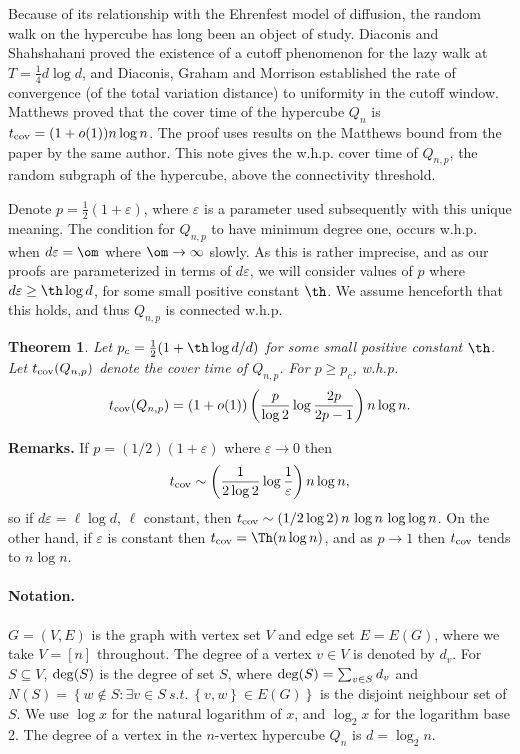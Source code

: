 \documentclass[12pt]{article}
\def\deg{\text{deg}}
\def\e{\varepsilon} \def\f{\phi} \def\F{{\Phi}} \def\vp{\varphi} \def\g{\gamma}
\newtheorem{theorem}{Theorem}
\newcommand{\ooi}{(1+o(1))}
\newcommand{\brac}[1]{\left(#1\right)}
\newcommand{\sfrac}[2]{\frac{\scriptstyle #1}{\scriptstyle #2}}
\def\half{\sfrac{1}{2}}
\newcommand{\rai}{\rightarrow \infty}
\newcommand{\ra}{\rightarrow}
\newcommand{\set}[1]{\left\{#1\right\}}
\def\seq{\subseteq}
\def\tc{t_{\rm cov}}
\def\deg{{\rm deg}}
\begin{document}
Because  of its relationship with the Ehrenfest model of diffusion, the random walk on the hypercube has long been an object of study. Diaconis and Shahshahani \cite{DS} proved the existence of a cutoff phenomenon for the lazy walk
at $T= \sfrac{1}{4} d \log d$, and Diaconis, Graham and Morrison \cite{DGM} established the  rate of convergence
(of the total variation distance) to uniformity in the cutoff window.
Matthews \cite{Matt2} proved that the cover time of the hypercube $Q_n$ is $\tc =\ooi n \log n$.
The proof uses
results on the Matthews bound from the paper \cite{Matt1} by the same author.
This note  gives the w.h.p. cover time of $Q_{n,p}$, the random subgraph of the hypercube, above the connectivity threshold.

Denote $p= \half(1+\e)$, where $\e$ is a parameter  used subsequently with this unique meaning.
The condition for $Q_{n,p}$ to have minimum degree one, occurs w.h.p. when $d \e=\om$ where $\om \rai$ slowly.
As this is rather imprecise, and as our proofs are parameterized in terms of $d\e$, we will consider values of $p$ where $d \e \ge \th \log d$, for  some small  positive constant $\th$.
We assume henceforth that this holds, and thus $Q_{n,p}$ is connected w.h.p.


\begin{theorem}\label{TH1}
Let $p_c=\half(1+\th \log d/d)$ for  some small  positive constant $\th$.
Let $\tc(Q_{n,p})$ denote the cover time of $Q_{n,p}$.
For $p \ge p_c$, w.h.p.
\begin{equation}\label{tcov}
\tc(Q_{n,p})=  %
\ooi\brac{\frac{p}{\log 2}\log \frac{2p}{2p-1}} n \log n.
\end{equation}
\end{theorem}
{\bf Remarks.}
If $p=(1/2)(1+\e)$ where $\e \ra 0$ then
\begin{equation}\label{tcov1/2}
\tc \sim \brac{ \frac 1{2\log 2} \log \frac 1{\e}} n \log n,
\end{equation}
so if    $d\e = \ell \log d$, $\ell$ constant, then $\tc \sim (1/2\log 2)\,  n \,\log n \,\log \log n$.
On the other hand, if $\e$ is constant then $\tc = \Th(n \log n)$, and as
$p \ra 1$ then $\tc$ tends to $ n \log n$.







\paragraph{Notation.}
 $G=(V,E)$ is the graph with vertex set $V$ and edge set $E=E(G)$, where we take $V=[n]$ throughout.   The degree of a vertex $v \in V$ is denoted by $d_v$. For $S \seq V$,    $\deg(S)$ is the degree of  set $S$, where $\deg(S)= \sum_{v \in S} d_v$ and
  $N(S)=\set{w\notin S:\exists v\in S\ s.t.\ \set{v,w}\in E(G)}$ is the disjoint neighbour set of $S$.
We use $\log x$ for the natural logarithm of  $x$, and $\log_2 x$ for the logarithm base 2.
  The degree of a vertex in the $n$-vertex hypercube $Q_n$ is $d=\log_2 n$.
\end{document}
